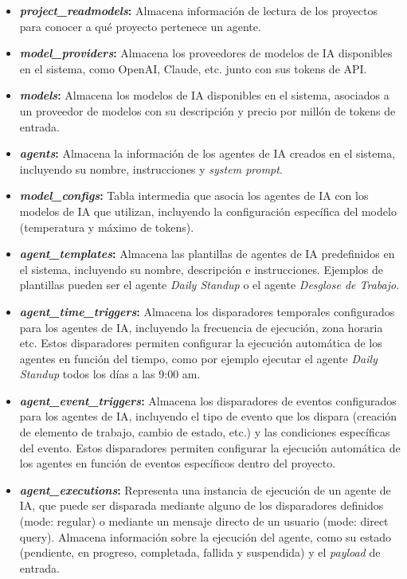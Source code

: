 \begin{itemize}
    \item \textbf{\emph{project\_readmodels}:} Almacena información de lectura de los proyectos para conocer a qué proyecto pertenece un agente.
    \item \textbf{\emph{model\_providers}:} Almacena los proveedores de modelos de \ac{IA} disponibles en el sistema, como OpenAI, Claude, etc. junto con sus tokens de \ac{API}.
    \item \textbf{\emph{models}:} Almacena los modelos de \ac{IA} disponibles en el sistema, asociados a un proveedor de modelos con su descripción y precio por millón de tokens de entrada.
    \item \textbf{\emph{agents}:} Almacena la información de los agentes de \ac{IA} creados en el sistema, incluyendo su nombre, instrucciones y \emph{system prompt}.
    \item \textbf{\emph{model\_configs}:} Tabla intermedia que asocia los agentes de \ac{IA} con los modelos de \ac{IA} que utilizan, incluyendo la configuración específica del modelo (temperatura y máximo de tokens).
    \item \textbf{\emph{agent\_templates}:} Almacena las plantillas de agentes de \ac{IA} predefinidos en el sistema, incluyendo su nombre, descripción e instrucciones. Ejemplos de plantillas pueden ser el agente \emph{Daily Standup} o el agente \emph{Desglose de Trabajo}.
    \item \textbf{\emph{agent\_time\_triggers}:} Almacena los disparadores temporales configurados para los agentes de \ac{IA}, incluyendo la frecuencia de ejecución, zona horaria etc. Estos disparadores permiten configurar la ejecución automática de los agentes en función del tiempo, como por ejemplo ejecutar el agente \emph{Daily Standup} todos los días a las 9:00 am.
    \item \textbf{\emph{agent\_event\_triggers}:} Almacena los disparadores de eventos configurados para los agentes de \ac{IA}, incluyendo el tipo de evento que los dispara (creación de elemento de trabajo, cambio de estado, etc.) y las condiciones específicas del evento. Estos disparadores permiten configurar la ejecución automática de los agentes en función de eventos específicos dentro del proyecto.
    \item \textbf{\emph{agent\_executions}:} Representa una instancia de ejecución de un agente de \ac{IA}, que puede ser disparada mediante alguno de los disparadores definidos (mode: regular) o mediante un mensaje directo de un usuario (mode: direct query). Almacena información sobre la ejecución del agente, como su estado (pendiente, en progreso, completada, fallida y suspendida) y el \emph{payload} de entrada.

\end{itemize}
